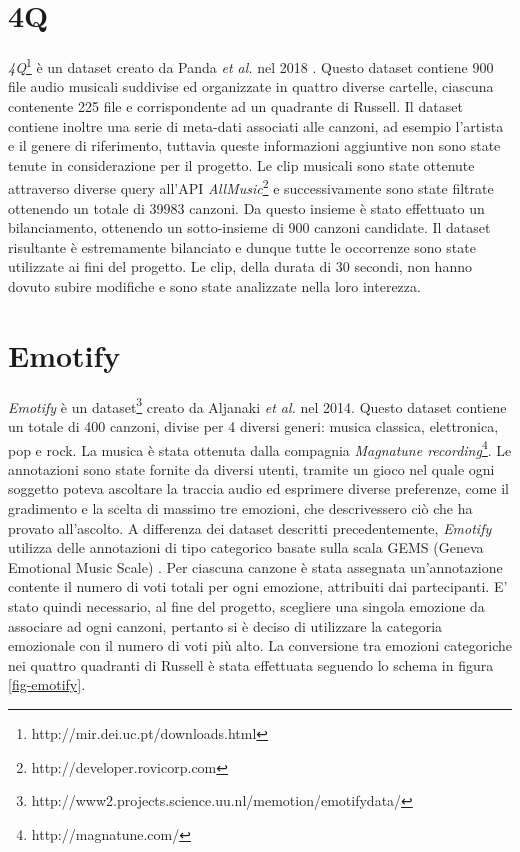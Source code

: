 \documentclass[11pt]{report}
\begin{document}
\section{4Q}
\textit{4Q}\footnote{http://mir.dei.uc.pt/downloads.html} è un dataset creato da Panda \textit{et al.} nel 2018 \cite{panda2018musical}\cite{panda2018novel}. Questo dataset contiene 900 file audio musicali suddivise ed organizzate in quattro diverse cartelle, ciascuna contenente 225 file e corrispondente ad un quadrante di Russell. Il dataset contiene inoltre una serie di meta-dati associati alle canzoni, ad esempio l'artista e il genere di riferimento, tuttavia queste informazioni aggiuntive non sono state tenute in considerazione per il progetto. Le clip musicali sono state ottenute attraverso diverse query all'API \textit{AllMusic}\footnote{http://developer.rovicorp.com} e successivamente sono state filtrate ottenendo un totale di 39983 canzoni. Da questo insieme è stato effettuato un bilanciamento, ottenendo un sotto-insieme di 900 canzoni candidate. Il dataset risultante è estremamente bilanciato e dunque tutte le occorrenze sono state utilizzate ai fini del progetto. Le clip, della durata di 30 secondi, non hanno dovuto subire modifiche e sono state analizzate nella loro interezza.



\section{Emotify}

\textit{Emotify} è un dataset\footnote{http://www2.projects.science.uu.nl/memotion/emotifydata/} creato da Aljanaki \textit{et al.} nel 2014\cite{aljanaki2014collecting}\cite{aljanaki2016studying}. Questo dataset contiene un totale di 400 canzoni, divise per 4 diversi generi: musica classica, elettronica, pop e rock. La musica è stata ottenuta dalla compagnia \textit{Magnatune recording}\footnote{http://magnatune.com/}. Le annotazioni sono state fornite da diversi utenti, tramite un gioco nel quale ogni soggetto poteva ascoltare la traccia audio ed esprimere diverse preferenze, come il gradimento e la scelta di massimo tre emozioni, che descrivessero ciò che ha provato all'ascolto. A differenza dei dataset descritti precedentemente, \textit{Emotify} utilizza delle annotazioni di tipo categorico basate sulla scala GEMS (Geneva Emotional Music Scale) \cite{zentner2008emotions}. Per ciascuna canzone è stata assegnata un'annotazione contente il numero di voti totali per ogni emozione, attribuiti dai partecipanti. E' stato quindi necessario, al fine del progetto, scegliere una singola emozione da associare ad ogni canzoni, pertanto si è deciso di utilizzare la categoria emozionale con il numero di voti più alto. La conversione tra emozioni categoriche nei quattro quadranti di Russell è stata effettuata seguendo lo schema in figura \ref{fig-emotify}.
\end{document}
